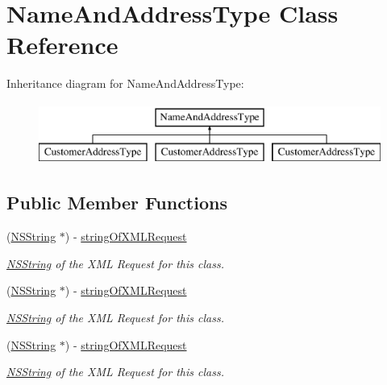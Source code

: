 \hypertarget{interface_name_and_address_type}{
\section{NameAndAddressType Class Reference}
\label{interface_name_and_address_type}
}
Inheritance diagram for NameAndAddressType:\begin{figure}[H]
\begin{center}
\leavevmode
\includegraphics[height=2.000000cm]{interface_name_and_address_type}
\end{center}
\end{figure}
\subsection*{Public Member Functions}
\begin{DoxyCompactItemize}
\item 
(\hyperlink{class_n_s_string}{NSString} $\ast$) -\/ \hyperlink{interface_name_and_address_type_ab8321d353b3ec46068dd808f03db1d72}{stringOfXMLRequest}
\begin{DoxyCompactList}\small\item\em \hyperlink{class_n_s_string}{NSString} of the XML Request for this class. \item\end{DoxyCompactList}\item 
(\hyperlink{class_n_s_string}{NSString} $\ast$) -\/ \hyperlink{interface_name_and_address_type_ab8321d353b3ec46068dd808f03db1d72}{stringOfXMLRequest}
\begin{DoxyCompactList}\small\item\em \hyperlink{class_n_s_string}{NSString} of the XML Request for this class. \item\end{DoxyCompactList}\item 
(\hyperlink{class_n_s_string}{NSString} $\ast$) -\/ \hyperlink{interface_name_and_address_type_ab8321d353b3ec46068dd808f03db1d72}{stringOfXMLRequest}
\begin{DoxyCompactList}\small\item\em \hyperlink{class_n_s_string}{NSString} of the XML Request for this class. \item\end{DoxyCompactList}\end{DoxyCompactItemize}
